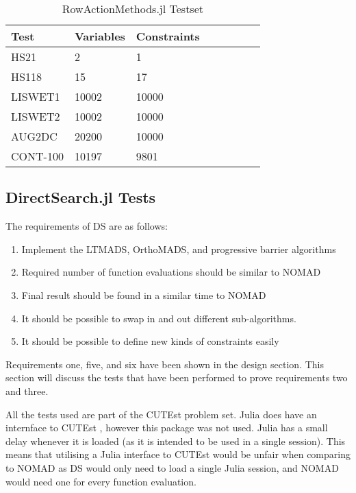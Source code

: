 \begin{table}[h] 
\centering
\begin{tabular}{llllllll} \toprule
    {Test}      & {Variables} & {Constraints} \\ \midrule
    {HS21}      & 2 & 1 \\
    {HS118}     & 15 & 17 \\ 
    {LISWET1}   & 10002 & 10000 \\  
    {LISWET2}   & 10002 & 10000 \\ 
    {AUG2DC}    & 20200 & 10000 \\ 
    {CONT-100}  & 10197 & 9801 \\ \bottomrule
\end{tabular}
    \caption{\label{table:ram_tests} RowActionMethods.jl Testset}
\end{table}

\subsection{DirectSearch.jl Tests}
The requirements of DS are as follows:
\begin{enumerate}
    \item Implement the LTMADS, OrthoMADS, and progressive barrier algorithms
    \item Required number of function evaluations should be similar to NOMAD
    \item Final result should be found in a similar time to NOMAD
    \item It should be possible to swap in and out different sub-algorithms.
    \item It should be possible to define new kinds of constraints easily
\end{enumerate}

Requirements one, five, and six have been shown in the design section. This section will discuss the tests that have been performed to prove requirements two and three. 

All the tests used are part of the CUTEst problem set. Julia does have an internface to CUTEst \cite{JuliaSmoothOptimizers/CUTEst.jl:Interface}, however this package was not used. Julia has a small delay whenever it is loaded (as it is intended to be used in a single session). This means that utilising a Julia interface to CUTEst would be unfair when comparing to NOMAD as DS would only need to load a single Julia session, and NOMAD would need one for every function evaluation. 


